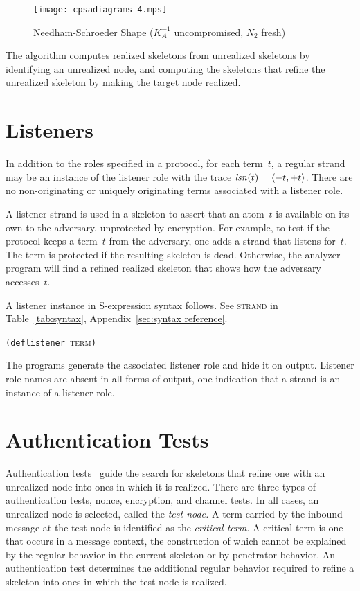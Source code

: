 \documentclass[12pt]{article}
\begin{document}
\begin{figure}
\begin{center}
\texttt{[image: cpsadiagrams-4.mps]}
\caption{Needham-Schroeder Shape ($K^{-1}_A$ uncompromised, $N_2$ fresh)}
\label{fig:ns shape}
\end{center}
\end{figure}

The {\cpsa} algorithm computes realized skeletons from unrealized
skeletons by identifying an unrealized node, and computing the
skeletons that refine the unrealized skeleton by making the target
node realized.

\section{Listeners}

In addition to the roles specified in a protocol, for each term~$t$, a
regular strand may be an instance of the listener role with the trace
$\operatorname{\mathit{lsn}}(t) = \langle\mathord - t, \mathord + t\rangle$.  There are no non-originating or
uniquely originating terms associated with a listener role.

A listener strand is used in a skeleton to assert that an atom~$t$ is
available on its own to the adversary, unprotected by encryption.  For
example, to test if the protocol keeps a term~$t$ from the adversary,
one adds a strand that listens for~$t$.  The term is protected if the
resulting skeleton is dead.  Otherwise, the {\cpsa} analyzer program
will find a refined realized skeleton that shows how the adversary
accesses~$t$.

A listener instance in S-expression syntax follows.  See
\textsc{strand} in Table~\ref{tab:syntax}, Appendix~\ref{sec:syntax
  reference}.
\begin{center}
\texttt{(deflistener }\textsc{term}\texttt{)}
\end{center}
The {\cpsa} programs generate the associated listener role and hide
it on output.  Listener role names are absent in all forms of output,
one indication that a strand is an instance of a listener role.

\section{Authentication Tests}\label{sec:authentication tests}

Authentication tests~\cite{GuttmanThayer02} guide the search for
skeletons that refine one with an unrealized node into ones in which
it is realized.  There are three types of authentication tests, nonce,
encryption, and channel tests.  In all cases, an unrealized node is
selected, called the \emph{test node.}  A term
carried by the inbound message at the test node is identified as the
\emph{critical term.}  A critical term is one
that occurs in a message context, the construction of which cannot be
explained by the regular behavior in the current skeleton or by
penetrator behavior.  An authentication test determines the additional
regular behavior required to refine a skeleton into ones in which the
test node is realized.
\end{document}
